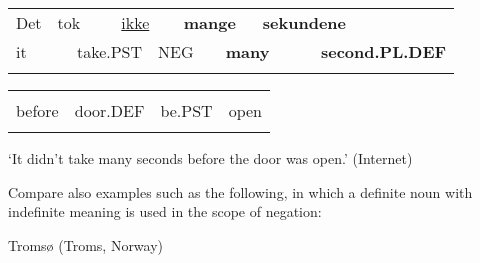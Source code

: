 \begin{tabular}{llllllllll}
\lsptoprule
Det & \multicolumn{2}{l}{tok

} & \multicolumn{2}{l}{\hyperlink{here}{ikke}

} & \multicolumn{2}{l}{{\bfseries mange}

} & \multicolumn{2}{l}{{\bfseries sekundene}

} & \\
\multicolumn{2}{l}{it

} & \multicolumn{2}{l}{take.PST

} & \multicolumn{2}{l}{NEG

} & \multicolumn{2}{l}{{\bfseries many}

} & \multicolumn{2}{l}{{\bfseries second.PL.DEF}

}\\
\lspbottomrule
\end{tabular}

\begin{tabular}{llll}
\lsptoprule
\multicolumn{4}{l}{før

}\\
before & door.DEF & be.PST & open\\
\lspbottomrule
\end{tabular}

\begin{styleTranslation}
 ‘It didn’t take many seconds before the door was open.’ (Internet)

\end{styleTranslation}

\begin{styleBodyTextFirst}
Compare also examples such as the following, in which a definite noun with indefinite meaning is used in the scope of negation:

\end{styleBodyTextFirst}


\begin{listWWNumileveli}
\item {}

\begin{styleExample}
Tromsø (Troms, Norway)

\end{styleExample}

\end{listWWNumileveli}

